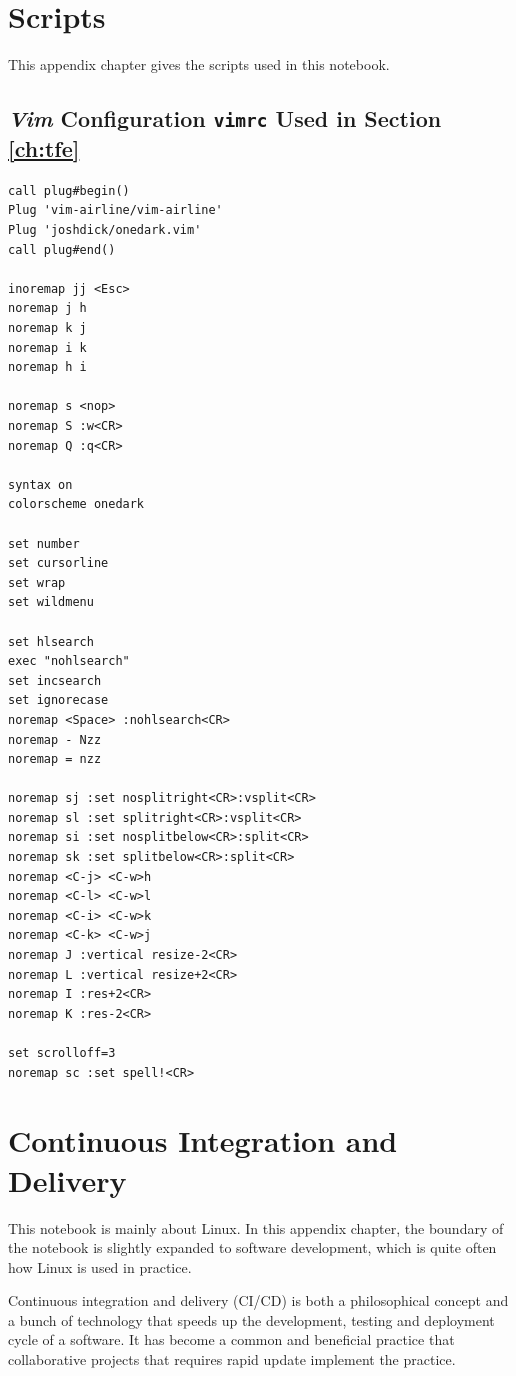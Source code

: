 \chapter{Scripts}

This appendix chapter gives the scripts used in this notebook.

\section{\textit{Vim} Configuration \texttt{vimrc} Used in Section \ref{ch:tfe}}

\begin{lstlisting}
call plug#begin()
Plug 'vim-airline/vim-airline'
Plug 'joshdick/onedark.vim'
call plug#end()

inoremap jj <Esc>
noremap j h
noremap k j
noremap i k
noremap h i

noremap s <nop>
noremap S :w<CR>
noremap Q :q<CR>

syntax on
colorscheme onedark

set number
set cursorline
set wrap
set wildmenu

set hlsearch
exec "nohlsearch"
set incsearch
set ignorecase
noremap <Space> :nohlsearch<CR>
noremap - Nzz
noremap = nzz

noremap sj :set nosplitright<CR>:vsplit<CR>
noremap sl :set splitright<CR>:vsplit<CR>
noremap si :set nosplitbelow<CR>:split<CR>
noremap sk :set splitbelow<CR>:split<CR>
noremap <C-j> <C-w>h
noremap <C-l> <C-w>l
noremap <C-i> <C-w>k
noremap <C-k> <C-w>j
noremap J :vertical resize-2<CR>
noremap L :vertical resize+2<CR>
noremap I :res+2<CR>
noremap K :res-2<CR>

set scrolloff=3
noremap sc :set spell!<CR>
\end{lstlisting}

\chapter{Continuous Integration and Delivery}

This notebook is mainly about Linux. In this appendix chapter, the boundary of the notebook is slightly expanded to software development, which is quite often how Linux is used in practice.

Continuous integration and delivery (CI/CD) is both a philosophical concept and a bunch of technology that speeds up the development, testing and deployment cycle of a software. It has become a common and beneficial practice that collaborative projects that requires rapid update implement the practice.

